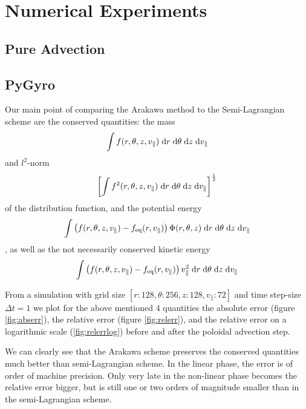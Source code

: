 

\section{Numerical Experiments}



\subsection{Pure Advection}








\subsection{PyGyro}

Our main point of comparing the Arakawa method to the Semi-Lagrangian scheme are the conserved quantities: the mass
\begin{equation}
	\int f(r, \theta, z, v_\parallel) \;\text{d} r \;\text{d} \theta \;\text{d} z \;\text{d} v_\parallel
\end{equation}
and $l^2$-norm
\begin{equation}
	\left[\int f^2(r, \theta, z, v_\parallel) \;\text{d} r \;\text{d} \theta \;\text{d} z \;\text{d} v_\parallel\right]^\frac{1}{2}
\end{equation}
of the distribution function, and the potential energy
\begin{equation}
	\int \left(f(r, \theta, z, v_\parallel) - f_\text{eq}(r, v_\parallel)\right) \Phi(r, \theta, z) \;\text{d} r \;\text{d} \theta \;\text{d} z \;\text{d} v_\parallel
\end{equation}
, as well as the not necessarily conserved kinetic energy
\begin{equation}
	\int \left(f(r, \theta, z, v_\parallel) - f_\text{eq}(r, v_\parallel)\right) v^2_\parallel \;\text{d} r \;\text{d} \theta \;\text{d} z \;\text{d} v_\parallel
\end{equation}

From a simulation with grid size $[r:128, \theta:256, z:128, v_\parallel :72]$ and time step-size $\Delta t = 1$ we plot for the above mentioned 4 quantities the absolute error (figure \ref{fig:abserr}), the relative error (figure \ref{fig:relerr}), and the relative error on a logarithmic scale (\ref{fig:relerrlog}) before and after the poloidal advection step.

We can clearly see that the Arakawa scheme preserves the conserved quantities much better than semi-Lagrangian scheme. In the linear phase, the error is of order of machine precision. Only very late in the non-linear phase becomes the relative error bigger, but is still one or two orders of magnitude smaller than in the semi-Lagrangian scheme.

